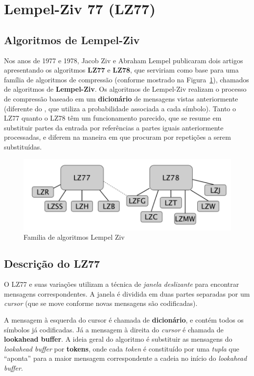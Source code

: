 \section{Lempel-Ziv 77 (LZ77)}

\subsection{Algoritmos de Lempel-Ziv}
Nos anos de 1977 e 1978, Jacob Ziv e Abraham Lempel publicaram dois artigos apresentando os algoritmos \textbf{LZ77} e \textbf{LZ78}, que serviriam como base para uma família de algoritmos de compressão (conforme mostrado na Figura~\ref{fig:lz77}), chamados de algoritmos de \textbf{Lempel-Ziv}.
Os algoritmos de Lempel-Ziv realizam o processo de compressão baseado em um \textbf{dicionário} de mensagens vistas anteriormente (diferente do , que utiliza a probabilidade associada a cada símbolo). 
Tanto o LZ77 quanto o LZ78 têm um funcionamento parecido, que se resume em substituir partes da entrada por referências a partes iguais anteriormente processadas, e diferem na maneira em que procuram por repetições a serem substituídas. 

\begin{figure}[h]
   \centering
   \includegraphics[scale=0.75]{figs/lz77fam.png}
    \caption{Familia de algoritmos Lempel Ziv}
    \label{fig:lz77}
 \end{figure}

\subsection{Descrição do LZ77}
O LZ77 e suas variações utilizam a técnica de \emph{janela deslizante} para encontrar mensagens correspondentes. 
A janela é dividida em duas partes separadas por um \emph{cursor} (que se move conforme novas mensagens são codificadas).

A mensagem à esquerda do cursor é chamada de \textbf{dicionário}, e contém todos os símbolos já codificadas. Já a mensagem à direita do \emph{cursor} é chamada de \textbf{lookahead buffer}.
A ideia geral do algoritmo é substituir as mensagens do \emph{lookahead buffer} por \textbf{tokens}, onde cada \emph{token} é constituído por uma \emph{tupla} que ``aponta''  para a maior mensagem correspondente a cadeia no início do \emph{lookahead buffer}.

